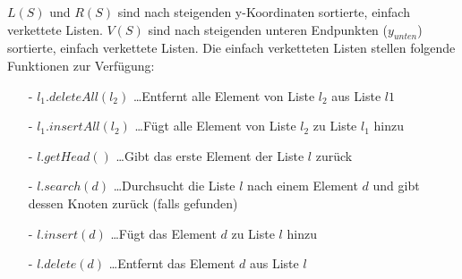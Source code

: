 \documentclass{article}
\begin{document}
$L(S)$ und $R(S)$ sind nach steigenden y-Koordinaten sortierte, einfach verkettete
Listen. $V(S)$ sind nach steigenden unteren Endpunkten ($y_{unten}$) sortierte,
einfach verkettete Listen.
%
Die einfach verketteten Listen stellen folgende Funktionen zur Verf{\"u}gung:
\begin{itemize}
  \item[-] $l_1.deleteAll(l_2)$ \ldots Entfernt alle Element von Liste $l_2$ aus
    Liste $l1$
  \item[-] $l_1.insertAll(l_2)$ \ldots F{\"u}gt alle Element von Liste $l_2$ zu
    Liste $l_1$ hinzu
  \item[-] $l.getHead()$ \ldots Gibt das erste Element der Liste $l$ zur{\"u}ck
  \item[-] $l.search(d)$ \ldots Durchsucht die Liste $l$ nach einem Element $d$
    und gibt dessen Knoten zur{\"u}ck (falls gefunden)
  \item[-] $l.insert(d)$ \ldots F{\"u}gt das Element $d$ zu Liste $l$ hinzu
  \item[-] $l.delete(d)$ \ldots Entfernt das Element $d$ aus Liste $l$
\end{itemize}
%
\end{document}
